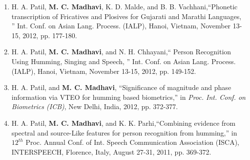 \documentclass[10pt]{article}
\begin{document}
\begin{enumerate}[resume]
\item  H. A. Patil, \textbf{M. C. Madhavi}, K. D. Malde, and B. B. Vachhani,``Phonetic transcription of Fricatives and Plosives for Gujarati and Marathi Languages, '' Int. Conf. on Asian Lang. Process. (IALP), Hanoi, Vietnam,  November 13-15, 2012, pp. 177-180. 
\item  H. A. Patil, \textbf{M. C. Madhavi}, and N. H. Chhayani,``
Person Recognition Using Humming, Singing and Speech, '' Int. Conf. on Asian Lang. Process. (IALP), Hanoi, Vietnam,  November 13-15, 2012, pp. 149-152. 
\item H. A. Patil, and \textbf{M. C. Madhavi}, ``Significance of magnitude and phase information via VTEO for humming based biometrics,'' in
\textit{Proc. Int. Conf. on Biometrics (ICB)}, New Delhi, India, 2012, pp. 372-377.

\item H. A. Patil, \textbf{M. C. Madhavi}, and K. K. Parhi,``Combining evidence from spectral and source-Like features for person recognition from humming,'' in $ 12^{th} $ Proc. Annual  Conf. of Int. Speech Communication Association (ISCA), INTERSPEECH,  Florence, Italy, August 27-31, 2011, pp. 369-372. 
\end{enumerate}
\end{document}

